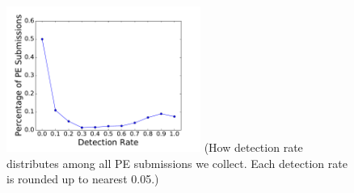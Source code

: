 \begin{figure}[t!]
\begin{center}
\includegraphics[width=2.5in]{figure/DetectionRate}
{\footnotesize{(How detection rate distributes among all PE submissions we collect. 
Each detection rate is rounded up to nearest 0.05.)}}
\end{center}
\end{figure}